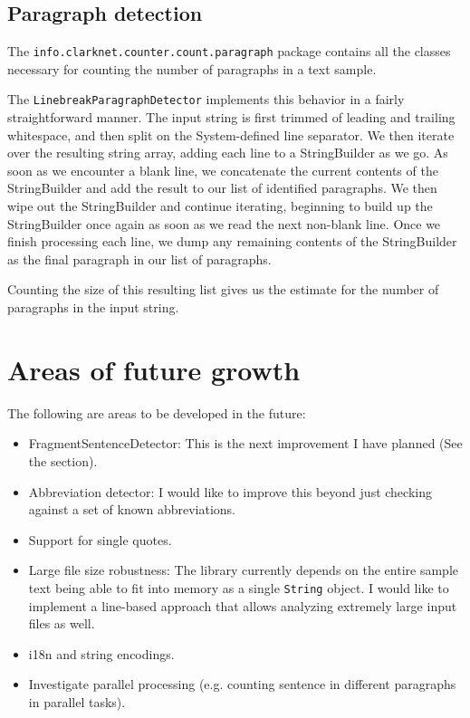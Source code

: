 \documentclass{article}
\begin{document}
\subsection{Paragraph detection}
The \texttt{info.clarknet.counter.count.paragraph} package contains all the classes necessary for counting the number of paragraphs in a text sample.

The \texttt{LinebreakParagraphDetector} implements this behavior in a fairly straightforward manner. The input string is first trimmed of leading and trailing whitespace, and then split on the System-defined line separator. We then iterate over the resulting string array, adding each line to a StringBuilder as we go. As soon as we encounter a blank line, we concatenate the current contents of the StringBuilder and add the result to our list of identified paragraphs. We then wipe out the StringBuilder and continue iterating, beginning to build up the StringBuilder once again as soon as we read the next non-blank line. Once we finish processing each line, we dump any remaining contents of the StringBuilder as the final paragraph in our list of paragraphs.

Counting the size of this resulting list gives us the estimate for the number of paragraphs in the input string.


\section{Areas of future growth}
The following are areas to be developed in the future:
\begin{itemize}
 \item FragmentSentenceDetector: This is the next improvement I have planned (See the  section).
 \item Abbreviation detector: I would like to improve this beyond just checking against a set of known abbreviations.
 \item Support for single quotes.
 \item Large file size robustness: The library currently depends on the entire sample text being able to fit into memory as a single \texttt{String} object. I would like to implement a line-based approach that allows analyzing extremely large input files as well.
 \item i18n and string encodings.
 \item Investigate parallel processing (e.g. counting sentence in different paragraphs in parallel tasks).
\end{itemize}
\end{document}
